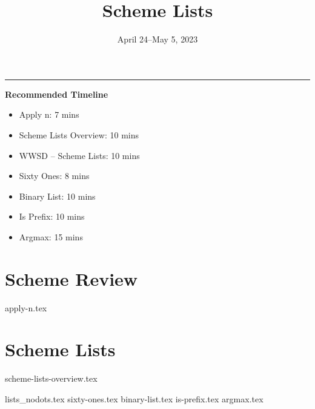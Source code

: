 \documentclass{exam}
\title{Scheme Lists}
\date{April 24--May 5, 2023}
\begin{document}
\maketitle\rule{\textwidth}{0.15em}

\begin{meta}
    \begin{blocksection}
        \textbf{Recommended Timeline}
        \begin{itemize}
            \item Apply n: 7 mins
            \item Scheme Lists Overview: 10 mins
            \item WWSD -- Scheme Lists: 10 mins
            \item Sixty Ones: 8 mins
            \item Binary List: 10 mins
            \item Is Prefix: 10 mins
            \item Argmax: 15 mins
        \end{itemize}
    \end{blocksection}
\end{meta}

\section{Scheme Review}
\begin{questions}
    {apply-n.tex}
\end{questions}

\section{Scheme Lists}
{scheme-lists-overview.tex}
\newpage
\begin{questions}
{lists_nodots.tex}
{sixty-ones.tex}
{binary-list.tex}
{is-prefix.tex}
{argmax.tex} 
\end{questions}
\end{document}
